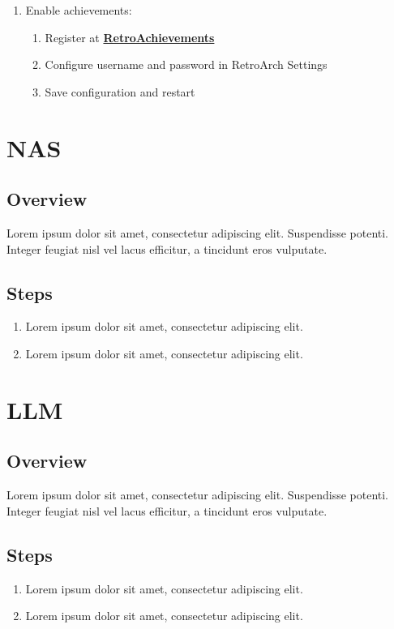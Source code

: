 \documentclass[a4paper,12pt]{article}
\begin{document}
\begin{enumerate}
    \item Enable achievements:
    \begin{enumerate}
        \item Register at \href{https://retroachievements.org}{\textbf{\color{blue}RetroAchievements}}
        \item Configure username and password in RetroArch Settings
        \item Save configuration and restart
    \end{enumerate}
\end{enumerate}

\section{NAS}

\subsection{Overview}
Lorem ipsum dolor sit amet, consectetur adipiscing elit. Suspendisse potenti. Integer feugiat nisl vel lacus efficitur, a tincidunt eros vulputate.

\subsection{Steps}
\begin{enumerate}
    \item Lorem ipsum dolor sit amet, consectetur adipiscing elit.
    \item Lorem ipsum dolor sit amet, consectetur adipiscing elit.
\end{enumerate}

\section{LLM}

\subsection{Overview}
Lorem ipsum dolor sit amet, consectetur adipiscing elit. Suspendisse potenti. Integer feugiat nisl vel lacus efficitur, a tincidunt eros vulputate.

\subsection{Steps}
\begin{enumerate}
    \item Lorem ipsum dolor sit amet, consectetur adipiscing elit.
    \item Lorem ipsum dolor sit amet, consectetur adipiscing elit.
\end{enumerate}
\end{document}

